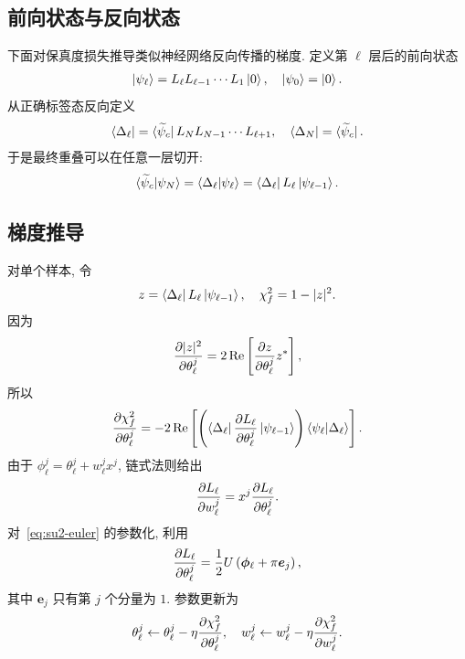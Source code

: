 \documentclass[a4paper]{ctexart}
\begin{document}
\subsection{前向状态与反向状态}

下面对保真度损失推导类似神经网络反向传播的梯度. 定义第 $\ell$ 层后的前向状态
\begin{align}
    \ket{\psi_\ell}=L_\ell L_{\ell-1}\cdots L_1\ket{0}, \quad \ket{\psi_0}=\ket{0}.
\end{align}
从正确标签态反向定义
\begin{align}
    \bra{\Delta_\ell}=\bra{\widetilde{\psi}_c}L_N L_{N-1}\cdots L_{\ell+1}, \quad\bra{\Delta_N}=\bra{\widetilde{\psi}_c}.
\end{align}
于是最终重叠可以在任意一层切开:
\begin{align}
    \braket{\widetilde{\psi}_c|\psi_N}=\braket{\Delta_\ell|\psi_\ell}=\bra{\Delta_\ell}L_\ell\ket{\psi_{\ell-1}}.
\end{align}

\subsection{梯度推导}

对单个样本, 令
\begin{align}
    z=\bra{\Delta_\ell}L_\ell\ket{\psi_{\ell-1}}, \quad \chi_f^2=1-\lvert z\rvert^2.
\end{align}
因为
\begin{align}
    \frac{\partial\lvert z\rvert^2}{\partial\theta_\ell^j}=2\operatorname{Re}\left[\frac{\partial z}{\partial\theta_\ell^j}z^\ast\right],
\end{align}
所以
\begin{align}
    \frac{\partial\chi_f^2}{\partial\theta_\ell^j}=-2\operatorname{Re}\left[\left(\bra{\Delta_\ell}\frac{\partial L_\ell}{\partial\theta_\ell^j}\ket{\psi_{\ell-1}}\right)\braket{\psi_\ell|\Delta_\ell}\right].
    \label{eq:loss-gradient}
\end{align}
由于 $\phi_\ell^j=\theta_\ell^j+w_\ell^j x^j$, 链式法则给出
\begin{align}
    \frac{\partial L_\ell}{\partial w_\ell^j}=x^j\frac{\partial L_\ell}{\partial\theta_\ell^j}.
\end{align}
对~\eqref{eq:su2-euler} 的参数化, 利用
\begin{align}
    \frac{\partial L_\ell}{\partial\theta_\ell^j}=\frac{1}{2} U\left(\bm{\phi}_\ell+\pi\bm{e}_j\right),
\end{align}
其中 $\bm{e}_j$ 只有第 $j$ 个分量为 $1$. 参数更新为
\begin{align}
    \theta_\ell^j \leftarrow \theta_\ell^j-\eta \frac{\partial\chi_f^2}{\partial\theta_\ell^j}, \quad w_\ell^j\leftarrow w_\ell^j-\eta \frac{\partial\chi_f^2}{\partial w_\ell^j}.
\end{align}
\end{document}
